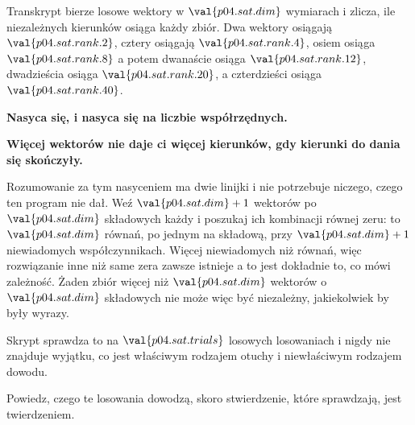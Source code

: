 \begin{fr}

Transkrypt bierze losowe wektory w $\val{p04.sat.dim}$ wymiarach i zlicza, ile
niezależnych kierunków osiąga każdy zbiór. Dwa wektory osiągają
$\val{p04.sat.rank.2}$, cztery osiągają $\val{p04.sat.rank.4}$, osiem osiąga
$\val{p04.sat.rank.8}$ \dash{} a potem dwanaście osiąga
$\val{p04.sat.rank.12}$, dwadzieścia osiąga $\val{p04.sat.rank.20}$, a
czterdzieści osiąga $\val{p04.sat.rank.40}$.

\textbf{Nasyca się, i nasyca się na liczbie współrzędnych.}
\end{fr}


\begin{fr}
\begin{trapbox}
\textbf{Więcej wektorów nie daje ci więcej kierunków, gdy kierunki do dania się
skończyły.}

Rozumowanie za tym nasyceniem ma dwie linijki i nie potrzebuje niczego, czego
ten program nie dał. Weź $\val{p04.sat.dim} + 1$ wektorów po
$\val{p04.sat.dim}$ składowych każdy i poszukaj ich kombinacji równej zeru: to
$\val{p04.sat.dim}$ równań, po jednym na składową, przy
$\val{p04.sat.dim} + 1$ niewiadomych współczynnikach. Więcej niewiadomych niż
równań, więc rozwiązanie inne niż same zera zawsze istnieje \dash{} a to jest
dokładnie to, co mówi zależność. Żaden zbiór więcej niż $\val{p04.sat.dim}$
wektorów o $\val{p04.sat.dim}$ składowych nie może więc być niezależny,
jakiekolwiek by były wyrazy.

Skrypt sprawdza to na $\val{p04.sat.trials}$ losowych losowaniach i nigdy nie
znajduje wyjątku, co jest właściwym rodzajem otuchy i niewłaściwym rodzajem
dowodu.
\end{trapbox}

Powiedz, czego te losowania dowodzą, skoro stwierdzenie, które sprawdzają, jest
twierdzeniem.
\dotline
\nextframe
\end{fr}

